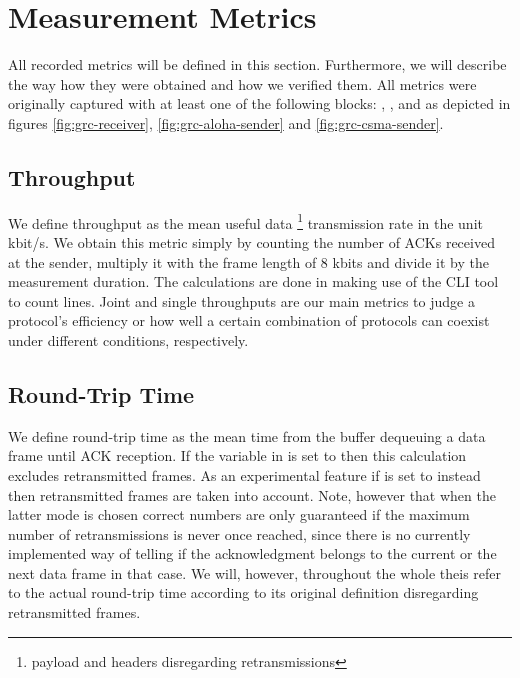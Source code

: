 \clearpage

\section{Measurement Metrics}
\label{sec:measurement-metrics}

All recorded metrics will be defined in this section. Furthermore, we will describe the way how they were obtained and how we verified them. All metrics were originally captured with at least one of the following blocks: , ,  and  as depicted in figures \ref{fig:grc-receiver}, \ref{fig:grc-aloha-sender} and \ref{fig:grc-csma-sender}.

\subsection{Throughput}

We define throughput as the mean useful data \footnote{payload and headers disregarding retransmissions} transmission rate in the unit kbit/s. We obtain this metric simply by counting the number of ACKs received at the sender, multiply it with the frame length of 8 kbits and divide it by the measurement duration. The calculations are done in  making use of the CLI tool  to count lines. Joint and single throughputs are our main metrics to judge a protocol's efficiency or how well a certain combination of protocols can coexist under different conditions, respectively.

\subsection{Round-Trip Time}

We define round-trip time as the mean time from the buffer dequeuing a data frame until ACK reception. If the variable  in  is set to  then this calculation excludes retransmitted frames. As an experimental feature if  is set to  instead then retransmitted frames are taken into account. Note, however that when the latter mode is chosen correct numbers are only guaranteed if the maximum number of retransmissions is never once reached, since there is no currently implemented way of telling if the acknowledgment belongs to the current or the next data frame in that case. We will, however, throughout the whole theis refer to the actual round-trip time according to its original definition disregarding retransmitted frames. 

